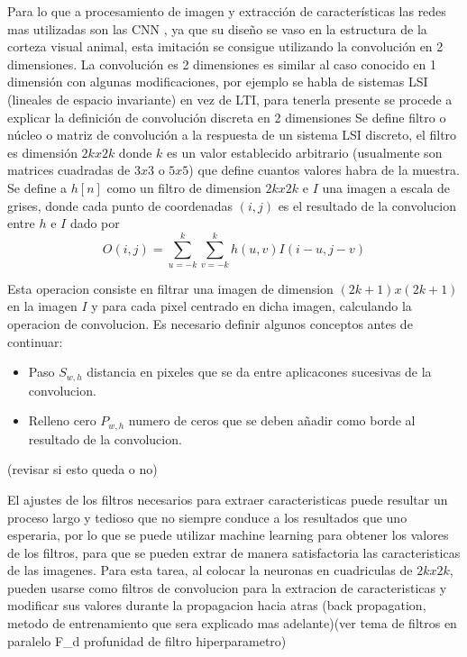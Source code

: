 Para lo que a procesamiento de imagen y extracción de características las redes mas utilizadas son las CNN , ya que su diseño se vaso en la estructura de la corteza visual animal, esta imitación se consigue utilizando la convolución en 2 dimensiones.
La convolución es 2 dimensiones es similar al caso conocido en  1 dimensión con algunas modificaciones, por ejemplo se habla de sistemas LSI (lineales de espacio invariante) en vez de LTI, para tenerla presente se procede a explicar la definición de convolución discreta en 2 dimensiones
Se define filtro o núcleo  o matriz de convolución a la respuesta de un sistema LSI discreto, el filtro es dimensión $2k x 2k$ donde $k$ es un valor establecido arbitrario (usualmente son matrices cuadradas de $3x3$ o $5x5$) que define cuantos valores habra de la muestra.
Se define a $h[n]$ como un filtro de dimension $2k x 2k$ e $I$ una imagen a escala de grises, donde cada punto de coordenadas $(i,j)$ es el resultado de la convolucion entre $h$ e $I$ dado por 
\begin{equation}
O(i,j)= \sum_{u=-k}^{k} \sum_{v=-k}^{k} h(u,v)I(i-u,j-v)
\end{equation}
 
Esta operacion consiste en filtrar una imagen de dimension $(2k+1)x(2k+1)$ en la imagen $I$ y para cada pixel centrado en dicha imagen, calculando la operacion de convolucion.
Es necesario definir algunos conceptos antes de continuar:
\begin{itemize}
\item Paso $S_{w,h}$ distancia en pixeles que se da entre aplicacones sucesivas de la convolucion.
\item Relleno cero $P_{w,h}$ numero de ceros que se deben añadir como borde al resultado de la convolucion.
\end{itemize} 
(revisar si esto queda o no)

El ajustes de los filtros necesarios para extraer caracteristicas puede resultar un proceso largo y tedioso que no siempre conduce a los resultados que uno esperaria, por lo que se puede utilizar machine learning para obtener los valores de los filtros, para que se pueden extrar de manera satisfactoria las caracteristicas de las imagenes.
Para esta tarea, al colocar la neuronas en cuadriculas de $2k x 2k$, pueden usarse como filtros de convolucion para la extracion de caracteristicas y modificar sus valores durante la propagacion hacia atras (back propagation, metodo de entrenamiento que sera explicado mas adelante)(ver tema de filtros en paralelo F_d profunidad de filtro hiperparametro)


